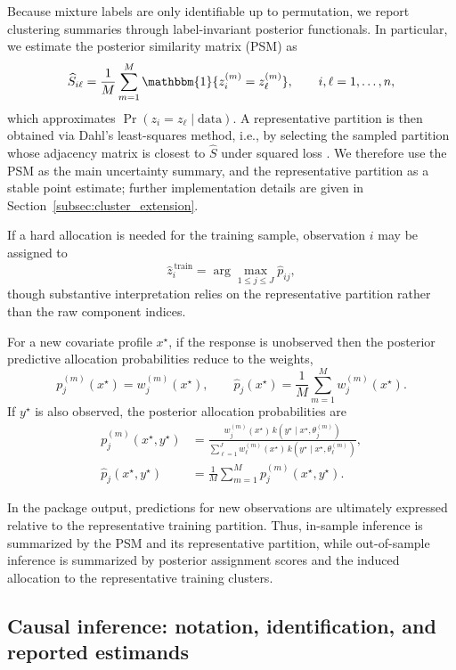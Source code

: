\documentclass[preprint,12pt,authoryear]{elsarticle}
\begin{document}
Because mixture labels are only identifiable up to permutation, we report clustering
summaries through label-invariant posterior functionals. In particular, we estimate
the posterior similarity matrix (PSM) as
\begin{equation*}
\widehat S_{i\ell}
=
\frac{1}{M}\sum_{m=1}^M
\mathbbm{1}\{z_i^{(m)}=z_\ell^{(m)}\},
\qquad i,\ell=1,\dots,n,
\end{equation*}
which approximates \(\Pr(z_i=z_\ell \mid \text{data})\). A representative partition is
then obtained via Dahl's least-squares method, i.e., by selecting the sampled partition
whose adjacency matrix is closest to \(\widehat S\) under squared loss
\citep{Dahl2006}. We therefore use the PSM as the main uncertainty summary, and the
representative partition as a stable point estimate; further implementation details are
given in Section~\ref{subsec:cluster_extension}.

If a hard allocation is needed for the training sample, observation \(i\) may be
assigned to
\[
\widehat z_i^{\,\mathrm{train}}
=
\arg\max_{1\le j\le J}\widehat p_{ij},
\]
though substantive interpretation relies on the representative partition rather than
the raw component indices.

For a new covariate profile \(x^\star\), if the response is unobserved then the
posterior predictive allocation probabilities reduce to the weights,
\[
p_j^{(m)}(x^\star)=w_j^{(m)}(x^\star),
\qquad
\widehat p_j(x^\star)=\frac{1}{M}\sum_{m=1}^M w_j^{(m)}(x^\star).
\]
If \(y^\star\) is also observed, the posterior allocation probabilities are
\[
\begin{aligned}
p_j^{(m)}(x^\star,y^\star)
&=
\frac{
w_j^{(m)}(x^\star)\,k(y^\star \mid x^\star,\theta_j^{(m)})
}{
\sum_{\ell=1}^J
w_\ell^{(m)}(x^\star)\,k(y^\star \mid x^\star,\theta_\ell^{(m)})
},\\
\widehat p_j(x^\star,y^\star)
&=
\frac{1}{M}\sum_{m=1}^M p_j^{(m)}(x^\star,y^\star).
\end{aligned}
\]

In the package output, predictions for new observations are ultimately expressed
relative to the representative training partition. Thus, in-sample inference is
summarized by the PSM and its representative partition, while out-of-sample inference
is summarized by posterior assignment scores and the induced allocation to the
representative training clusters.

\subsection{Causal inference: notation, identification, and reported estimands}
\label{subsec:causal}
\end{document}
